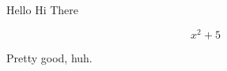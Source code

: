 \documentclass{article}
\begin{document}
Hello Hi There

\begin{equation}
x^2 + 5
\end{equation}

Pretty good, huh.
\end{document}
